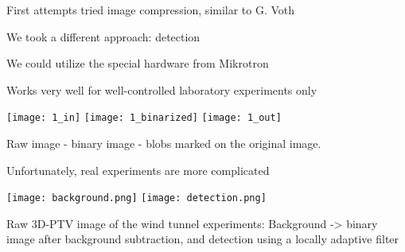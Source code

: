 \begin{frame}[label=real-5a]{First attempts tried image compression, similar to G. Voth}
    \centering{}
\end{frame}


\begin{frame}[label=real-6]{We took a different approach: detection}
    \centering{}
\end{frame}


\begin{frame}[label=real-5b]{We could utilize the special hardware from Mikrotron }
    \begin{multicols*}{2}
    \end{multicols*}
    \centering {}
\end{frame}


\begin{frame}[label=real-7]{Works very well for well-controlled laboratory experiments only}
    \begin{card}
    \centering
    \texttt{[image: 1\_in]}
    \texttt{[image: 1\_binarized]}
    \texttt{[image: 1\_out]}
    \end{card}
    \vspace{-.5cm}
    \begin{cardTiny}
    Raw image - binary image - blobs marked on the original image.  
    \end{cardTiny}
\end{frame}


\begin{frame}[label=real-8]{Unfortunately, real experiments are more complicated}
    \begin{multicols}{2}
    \texttt{[image: background.png]}
    \texttt{[image: detection.png]}
    \end{multicols}
    \begin{cardTiny}
    Raw 3D-PTV image of the wind tunnel experiments: Background ->  binary image after background subtraction, and detection using a locally adaptive filter
    \end{cardTiny}
\end{frame}


